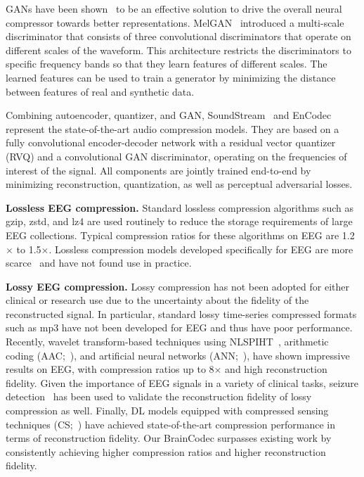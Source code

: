 \documentclass{article} %
\begin{document}
GANs have been shown~\citep{Kumar2019, Yamamoto2020, Kong2020} to be an effective solution to drive the overall neural compressor towards better representations. MelGAN~\citep{Kumar2019} introduced a multi-scale discriminator that consists of three convolutional discriminators that operate on different scales of the waveform. This architecture restricts the discriminators to specific frequency bands so that they learn features of different scales. The learned features can be used to train a generator by minimizing the distance between features of real and synthetic data.

Combining autoencoder, quantizer, and GAN, SoundStream~\citep{Zeghidour2022} and EnCodec~\citep{Defossez2023} represent the state-of-the-art audio compression models. They are based on a fully convolutional encoder-decoder network with a residual vector quantizer (RVQ) and a convolutional GAN discriminator, operating on the frequencies of interest of the signal. All components are jointly trained end-to-end by minimizing reconstruction, quantization, as well as perceptual adversarial losses. 

\textbf{Lossless EEG compression.} Standard lossless compression algorithms such as gzip, zstd, and lz4 are used routinely to reduce the storage requirements of large EEG collections. Typical compression ratios for these algorithms on EEG are 1.2$\times$ to 1.5$\times$. Lossless compression models developed specifically for EEG are more scarce~\citep{Alsenwi2018, Hadi2021, AlNassrawy2022} and have not found use in practice.

\textbf{Lossy EEG compression.} Lossy compression has not been adopted for either clinical or research use due to the uncertainty about the fidelity of the reconstructed signal. In particular, standard lossy time-series compressed formats such as mp3 have not been developed for EEG and thus have poor performance. Recently, wavelet transform-based techniques using NLSPIHT~\citep{Xu2015}, arithmetic coding (AAC;~\cite{Nguyen2017}), and artificial neural networks (ANN;~\cite{Hejrati2017}), have shown impressive results on EEG, with compression ratios up to 8$\times$ and high reconstruction fidelity. Given the importance of EEG signals in a variety of clinical tasks, seizure detection~\citep{Nguyen2018} has been used to validate the reconstruction fidelity of lossy compression as well. Finally, DL models equipped with compressed sensing techniques (CS;~\cite{Du2024}) have achieved state-of-the-art compression performance in terms of reconstruction fidelity. Our BrainCodec surpasses existing work by consistently achieving higher compression ratios and higher reconstruction fidelity.
\end{document}
